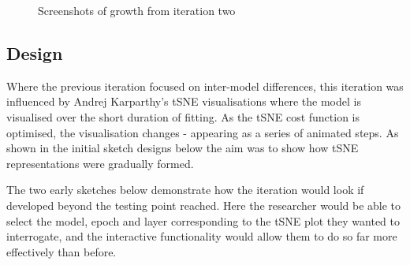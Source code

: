 \documentclass[a4paper,11pt,titlepage]{article}
\begin{document}
		\begin{figure}[H]
    			\centering	
    			\qquad
    			 \qquad
    			\caption{Screenshots of growth from iteration two}%
    			\label{fig:iter2}
	\end{figure}	
	
	\subsection{Design}
	Where the previous iteration focused on inter-model differences, this iteration was influenced by Andrej Karparthy's tSNE visualisations where the model is visualised over the short duration of fitting. As the tSNE cost function is optimised, the visualisation changes - appearing as a series of animated steps. As shown in the initial sketch designs below the aim was to show how tSNE representations were gradually formed.
	\par 
	The two early sketches below demonstrate how the iteration would look if developed beyond the testing point reached. Here the researcher would be able to select the model, epoch and layer corresponding to the tSNE plot they wanted to interrogate, and the interactive functionality would allow them to do so far more effectively than before.
\end{document}
